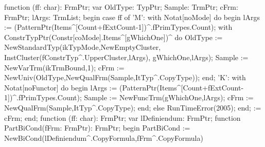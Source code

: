 \nwendcode{}\nwdocspar

\nwenddocs{}\endmoddef\nwstartdeflinemarkup{}\nwenddeflinemarkup
function (ff: char): FrmPtr;
var
   OldType: TypPtr;
   Sample: TrmPtr;
   cFrm: FrmPtr;
   lArgs: TrmList;
begin
   case ff of
      'M':
         with Notat[noMode] do
         begin
            lArgs := (PatternPtr(Items^[Count+fExtCount-1])^.fPrimTypes.Count);
            with  ConstrTypPtr(Constr[coMode].Items^[gWhichOne])^ do
               OldType := 
               NewStandardTyp(ikTypMode,NewEmptyCluster,
                              InstCluster(fConstrTyp^.UpperCluster,lArgs),
                              gWhichOne,lArgs);
            Sample := NewVarTrm(ikTrmBound,1);
            cFrm := NewUniv(OldType,NewQualFrm(Sample,ItTyp^.CopyType));
         end;
      'K':
         with Notat[noFunctor] do
         begin
            lArgs := (PatternPtr(Items^[Count+fExtCount-1])^.fPrimTypes.Count);
            Sample := NewFuncTrm(gWhichOne,lArgs);
            cFrm := NewQualFrm(Sample,ItTyp^.CopyType);
         end;
      else
         RunTimeError(2005);
   end;
    := cFrm;
end;
\eatline
{}\nwendcode{}\nwdocspar
\nwenddocs{}\endmoddef\nwstartdeflinemarkup{}\nwenddeflinemarkup
function (ff: char): FrmPtr;
var
   lDefiniendum: FrmPtr;
   function PartBiCond(fFrm: FrmPtr): FrmPtr;
   begin
      PartBiCond := NewBiCond(lDefiniendum^.CopyFormula,fFrm^.CopyFormula)
